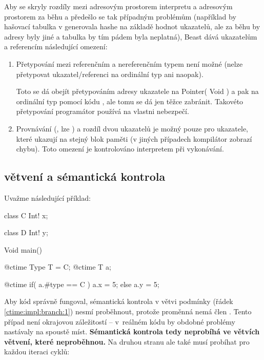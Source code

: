 Aby se skryly rozdíly mezi adresovým prostorem interpretu a adresovým prostorem za běhu a předešlo se tak případným problémům (například by hašovací tabulka v \ctime generovala hashe na základě hodnot ukazatelů, ale za běhu by adresy byly jiné a tabulka by tím pádem byla neplatná), Beast dává \ctime ukazatelům a referencím následující omezení:
\begin{enumerate}
	\item Přetypování mezi referenčním a nereferenčním typem není možné (nelze přetypovat ukazatel/referenci na ordinální typ ani naopak).
	
	Toto se dá obejít přetypováním adresy ukazatele na Pointer( Void ) a pak na ordinální typ pomocí kódu , ale tomu se dá jen těžce zabránit. Takovéto přetypování programátor používá na vlastni nebezpečí.
	
	\item Provnávání (\inlineCode{< > <= >=}, lze ) a rozdíl dvou ukazatelů je možný pouze pro ukazatele, které ukazují na stejný blok paměti (v jiných případech kompilátor zobrazí chybu). Toto omezení je kontrolováno interpretem při vykonávání.
\end{enumerate}

\subsection{\ctime větvení a sémantická kontrola}

Uvažme následující příklad:

\begin{code}
class C {
	Int! x;
}

class D {
	Int! y;
}
	
Void main() {
	@ctime Type T = C;
	@ctime T a;
	
	@ctime if( a.#type == C )
		a.x = 5;
	else
		a.y = 5; $\label{ctime:impl:branch:1}$
}
\end{code}

Aby kód správně fungoval, sémantická kontrola v  větvi podmínky (řádek \ref{ctime:impl:branch:1}) nesmí proběhnout, protože proměnná  nemá člen . Tento případ není okrajovou záležitostí -- v~reálném \ctime kódu by obdobné problémy nastávaly na spoustě míst. \textbf{Sémantická kontrola tedy neprobíhá ve větvích \ctime větvení, které neproběhnou.} Na druhou stranu ale také musí probíhat pro každou iteraci \ctime cyklů:

